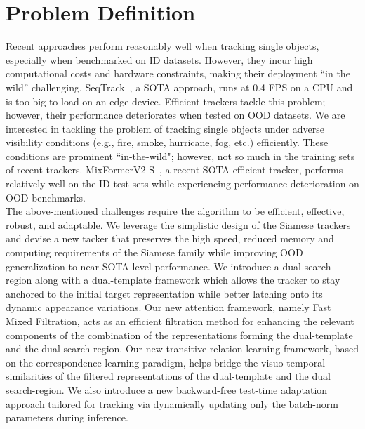 \chapter{Problem Definition} %

\label{Chapter3} %

Recent approaches perform reasonably well when tracking single objects, especially when benchmarked on ID datasets. 
However, they incur high computational costs and hardware constraints, making their deployment “in the wild” challenging. 
SeqTrack~\cite{chen2023seqtrack}, a SOTA approach, runs at 0.4 FPS on a CPU and is too big to load on an edge device.
Efficient trackers tackle this problem; however, their performance deteriorates when tested on OOD datasets.
We are interested in tackling the problem of tracking single objects under adverse visibility conditions (e.g., fire, smoke, hurricane, fog, etc.) efficiently.
These conditions are prominent ``in-the-wild"; however, not so much in the training sets of recent trackers.
MixFormerV2-S~\cite{cui2024mixformerv2}, a recent SOTA efficient tracker, performs relatively well on the ID test sets while experiencing performance deterioration on OOD benchmarks. \\


The above-mentioned challenges require the algorithm to be efficient, effective, robust, and adaptable. 
We leverage the simplistic design of the Siamese trackers and devise a new tacker that preserves the high speed, reduced memory and computing requirements of the Siamese family while improving OOD generalization to near SOTA-level performance.
We introduce a dual-search-region along with a dual-template framework which allows the tracker to stay anchored to the initial target representation while better latching onto its dynamic appearance variations.
Our new attention framework, namely Fast Mixed Filtration, acts as an efficient filtration method for enhancing the relevant components of the combination of the representations forming the dual-template and the dual-search-region.
Our new transitive relation learning framework, based on the correspondence learning paradigm, helps bridge the visuo-temporal similarities of the filtered representations of the dual-template and the dual search-region.
We also introduce a new backward-free test-time adaptation approach tailored for tracking via dynamically updating only the batch-norm parameters during inference.






